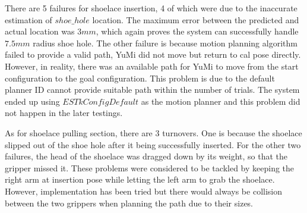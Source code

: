There are 5 failures for shoelace insertion, 4 of which were due to the inaccurate estimation of $shoe\_hole$ location. The maximum error between the predicted and actual location was $3mm$, which again proves the system can successfully handle $7.5mm$ radius shoe hole. The other failure is because motion planning algorithm failed to provide a valid path, YuMi did not move but return to cal pose directly. However, in reality, there was an available path for YuMi to move from the start configuration to the goal configuration. This problem is due to the default planner ID cannot provide suitable path within the number of trials. The system ended up using $ESTkConfigDefault$ as the motion planner and this problem did not happen in the later testings.

As for shoelace pulling section, there are 3 turnovers. One is because the shoelace slipped out of the shoe hole after it being successfully inserted. For the other two failures, the head of the shoelace was dragged down by its weight, so that the gripper missed it. These problems were considered to be tackled by keeping the right arm at insertion pose while letting the left arm to grab the shoelace. However, implementation has been tried but there would always be collision between the two grippers when planning the path due to their sizes. 


